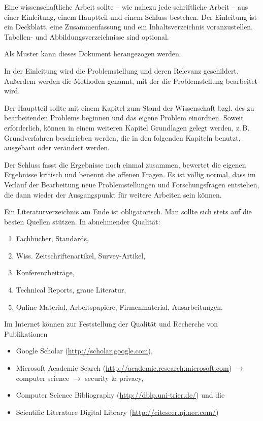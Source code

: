 \documentclass[
    fontsize=12pt,
    headings=small,
    parskip=half,           %
    bibliography=totoc,
    numbers=noenddot,       %
    open=any,               %
    ]{scrreprt}
\begin{document}
Eine wissenschaftliche Arbeit sollte -- wie nahezu jede schriftliche Arbeit -- aus einer Einleitung, einem Hauptteil und einem Schluss bestehen. Der Einleitung ist ein Deckblatt, eine Zusammenfassung und ein Inhaltsverzeichnis voranzustellen. Tabellen- und Abbildungsverzeichnisse sind optional.

Als Muster kann dieses Dokument herangezogen werden.

In der Einleitung wird die Problemstellung und deren Relevanz geschildert. Außerdem werden die Methoden genannt, mit der die Problemstellung bearbeitet wird.

Der Hauptteil sollte mit einem Kapitel zum Stand der Wissenschaft bzgl. des zu bearbeitenden Problems beginnen und das eigene Problem einordnen. Soweit erforderlich, können in einem weiteren Kapitel Grundlagen gelegt werden, z.\,B. Grundverfahren beschrieben werden, die in den folgenden Kapiteln benutzt, ausgebaut oder verändert werden.

Der Schluss fasst die Ergebnisse noch einmal zusammen, bewertet die eigenen Ergebnisse kritisch und benennt die offenen Fragen. Es ist völlig normal, dass im Verlauf der Bearbeitung neue Problemstellungen und Forschungsfragen entstehen, die dann wieder der Ausgangspunkt für weitere Arbeiten sein können.

Ein Literaturverzeichnis am Ende ist obligatorisch. Man sollte sich stets auf die besten Quellen stützen. In abnehmender Qualität:

\begin{enumerate}
	\item Fachbücher, Standards,
	\item Wiss. Zeitschriftenartikel, Survey-Artikel,
	\item Konferenzbeiträge,
	\item Technical Reports, graue Literatur,
	\item Online-Material, Arbeitspapiere, Firmenmaterial, Ausarbeitungen.
\end{enumerate}

Im Internet können zur Feststellung der Qualität und Recherche von Publikationen

\begin{itemize}
	\item Google Scholar (\url{http://scholar.google.com}),
	\item Microsoft Academic Search (\href{http://academic.research.microsoft.com/?SearchDomain=2&SubDomain=2&entitytype=2}{http://academic.research.microsoft.com}) $\to$ computer science $\to$ security \& privacy,
	\item Computer Science Bibliography (\url{http://dblp.uni-trier.de/}) und die
	\item Scientific Literature Digital Library (\url{http://citeseer.nj.nec.com/})
\end{itemize}
\end{document}
